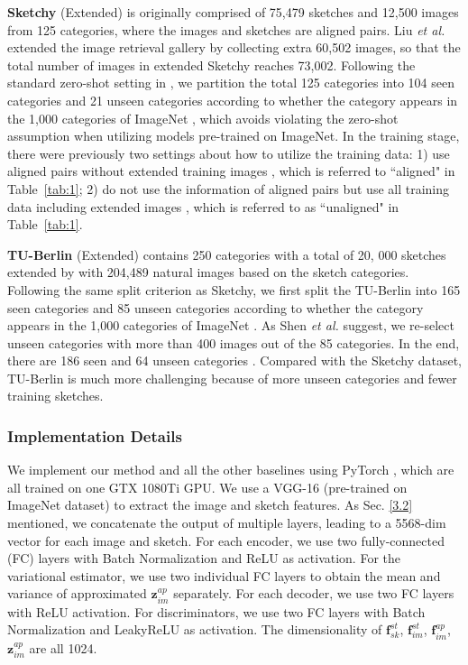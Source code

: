 \documentclass[10pt,twocolumn,letterpaper]{article}
\begin{document}
\textbf{Sketchy} (Extended) \cite{sangkloy2016sketchy} is originally comprised of 75,479 sketches and 12,500 images from 125 categories, where the images and sketches are aligned pairs. Liu \textit{et al.} \cite{liu2017deep} extended the image retrieval gallery by collecting extra 60,502 images, so that the total number of images in extended Sketchy reaches 73,002. Following the standard zero-shot setting in \cite{yelamarthi2018zero}, we partition the total 125 categories into 104 seen categories and 21 unseen categories according to whether the category appears in the 1,000 categories of ImageNet \cite{deng2009imagenet}, which avoids violating the zero-shot assumption when utilizing models pre-trained on ImageNet. In the training stage, there were previously two settings about how to utilize the training data: 1) use aligned pairs without extended training images \cite{yelamarthi2018zero}, which is referred to ``aligned" in Table~\ref{tab:1}; 2) do not use the information of aligned pairs but use all training data including extended images \cite{shen2018zero}, which is referred to as ``unaligned" in Table~\ref{tab:1}.

\textbf{TU-Berlin} (Extended) \cite{eitz2012hdhso} contains 250 categories with a total of 20, 000 sketches extended by \cite{liu2017deep} with 204,489 natural images based on the sketch categories. Following the same split criterion as Sketchy, we first split the TU-Berlin into 165 seen categories and 85 unseen categories according to whether the category appears in the 1,000 categories of ImageNet \cite{deng2009imagenet}. As Shen \textit{et al.} \cite{shen2018zero} suggest, we re-select unseen categories with more than 400 images out of the 85 categories. In the end, there are 186 seen and 64 unseen categories \footnotemark . Compared with the Sketchy dataset, TU-Berlin is much more challenging because of more unseen categories and fewer training sketches.

\subsubsection{Implementation Details}
We implement our method and all the other baselines using PyTorch \cite{paszke2017automatic}, which are all trained on one GTX 1080Ti GPU. We use a VGG-16 (pre-trained on ImageNet dataset) to extract the image and sketch features. As Sec. \ref{3.2} mentioned, we concatenate the output of multiple layers, leading to a 5568-dim vector for each image and sketch. For each encoder, we use two fully-connected (FC) layers with Batch Normalization and ReLU as activation. For the variational estimator, we use two individual FC layers to obtain the mean and variance of approximated $\mathbf{z}_{im}^{ap}$ separately. For each decoder, we use two FC layers with ReLU activation. For discriminators, we use two FC layers with Batch Normalization and LeakyReLU as activation. The dimensionality of $\mathbf{f}_{sk}^{st}$, $\mathbf{f}_{im}^{st}$, $\mathbf{f}_{im}^{ap}$, $\mathbf{z}_{im}^{ap}$ are all 1024.
\end{document}
